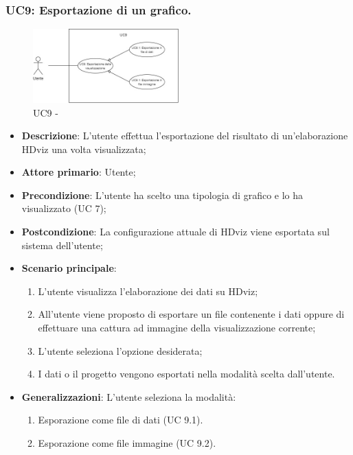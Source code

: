 \subsubsection{UC9: Esportazione di un grafico.}
\label{sub:uc9}

\begin{figure}[h]
    \centering
    \includegraphics[width=0.5\textwidth]{componenti/casi-duso/diagrammi/UC9.jpg}
    \caption{UC9 - }
    \label{fig:UC9}
\end{figure}


\begin{itemize}
    \item{\textbf{Descrizione}}: L'utente effettua l'esportazione del risultato di un'elaborazione HDviz una volta visualizzata;
    \item{\textbf{Attore primario}}: Utente;
    \item{\textbf{Precondizione}}: L'utente ha scelto una tipologia di grafico e lo ha visualizzato (UC 7);
    \item{\textbf{Postcondizione}}: La configurazione attuale di HDviz viene esportata sul sistema dell'utente;
    \item{\textbf{Scenario principale}}:
    \begin{enumerate}
        \item   L'utente visualizza l'elaborazione dei dati su HDviz;
        \item   All'utente viene proposto di esportare un file contenente i dati oppure 
                di effettuare una cattura ad immagine della visualizzazione corrente;
        \item   L'utente seleziona l'opzione desiderata;
        \item   I dati o il progetto vengono esportati nella modalità scelta dall'utente.
    \end{enumerate}
    
    \item{\textbf{Generalizzazioni}}: L'utente seleziona la modalità:
    \begin{enumerate}
        \item   Esporazione come file di dati (UC 9.1).
        \item   Esporazione come file immagine (UC 9.2).
    \end{enumerate} 
\end{itemize}

